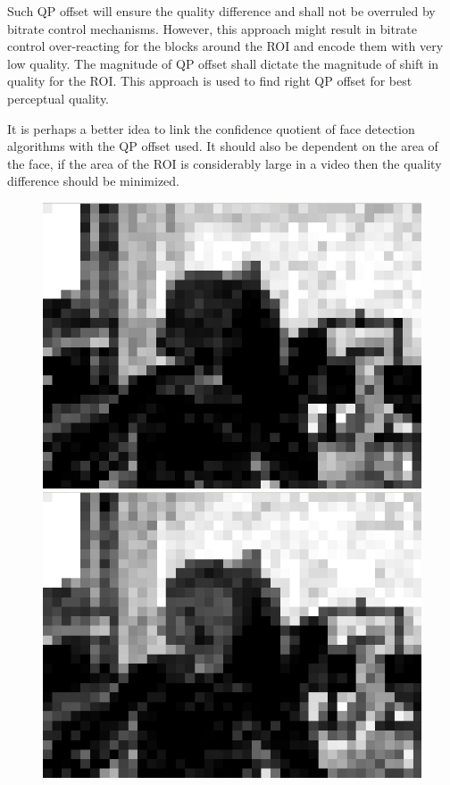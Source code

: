 \documentclass[11pt]{article} %
\begin{document}
Such QP offset will ensure the quality difference and shall not be overruled by bitrate control mechanisms. However, this approach might result in bitrate control over-reacting for the blocks around the ROI and encode them with very low quality. The magnitude of QP offset shall dictate the magnitude of shift in quality for the ROI. This approach is used to find right QP offset for best perceptual quality. 

It is perhaps a better idea to link the confidence quotient of face detection algorithms with the QP offset used. It should also be dependent on the area of the face, if the area of the ROI is considerably large in a video then the quality difference should be minimized. 

\begin{figure}[!h]
    \centering
    \includegraphics[scale=0.4]{PaulDefault120_91250kbps_psnr}
    \includegraphics[scale=0.4]{QPOffset/paul120_250kbps_QPoffset4_psnr}

\end{figure}
\end{document}

